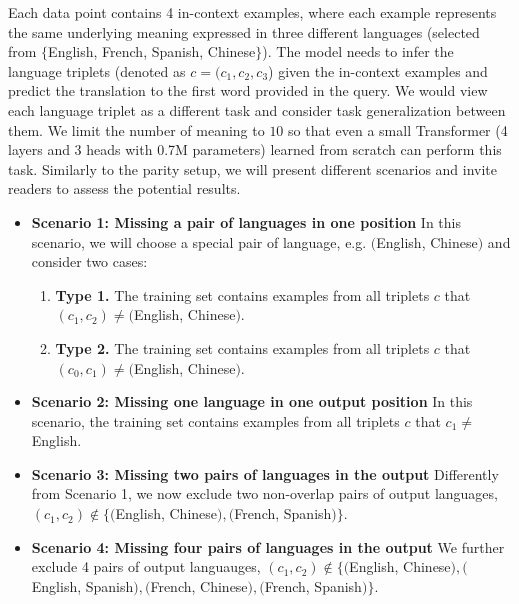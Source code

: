 
Each data point contains 4 in-context examples, where each example represents the same underlying meaning expressed in three different languages (selected from $\{$English, French, Spanish, Chinese$\}$). The model needs to infer the language triplets (denoted as $c = (c_1, c_2, c_3$) given the in-context examples and predict the translation to the first word provided in the query. We would view each language triplet as a different task and consider task generalization between them. We limit the number of meaning to $10$ so that even a small Transformer (4 layers and 3 heads with 0.7M parameters) learned from scratch can perform this task. Similarly to the parity setup, we will present different scenarios and invite readers to assess the potential results.


\begin{itemize}
    \item \textbf{Scenario 1: Missing a pair of languages in one position}
    In this scenario, we will choose a special pair of language, e.g. $($English, Chinese$)$ and consider two cases:
    \begin{enumerate}
        \item \textbf{Type 1.} The training set contains examples from all triplets $c$ that $(c_1, c_2) \neq ($English, Chinese$)$.
        \item \textbf{Type 2.} The training set contains examples from all triplets $c$ that $(c_0, c_1) \neq ($English, Chinese$)$.
    \end{enumerate}
    
    \item \textbf{Scenario 2: Missing one language in one output position} In this scenario, the training set contains examples from all triplets  $c$ that $c_1 \neq $ English.
    
    \item \textbf{Scenario 3: Missing two pairs of languages in the output} Differently from Scenario 1, we now exclude two non-overlap pairs of output languages,  $(c_1, c_2) \not \in \{($English, Chinese$),($French, Spanish$)\}$.

    \item \textbf{Scenario 4: Missing four pairs of languages in the output} We further exclude 4 pairs of output languauges,  $(c_1, c_2) \not \in \{($English, Chinese$), ($English, Spanish$), ($French, Chinese$), ($French, Spanish$)\}$.
\end{itemize}

